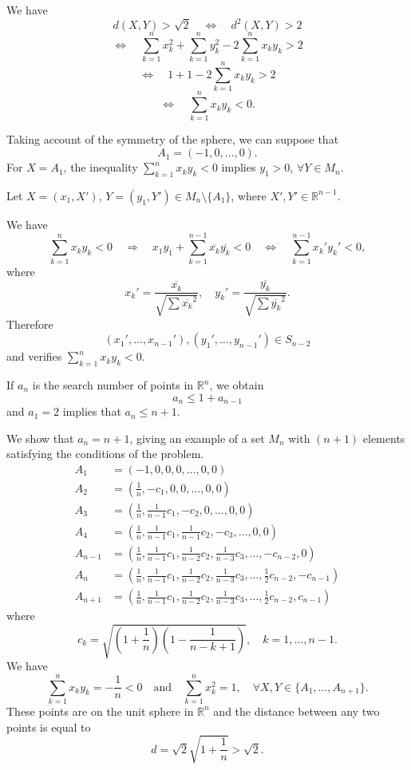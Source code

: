 \documentclass{article}
\begin{document}
We have
\[
d(X,Y) > \sqrt{2} \quad \Leftrightarrow \quad d^2(X,Y) > 2
\]
\[
\Leftrightarrow \quad \sum_{k=1}^n x_k^2 + \sum_{k=1}^n y_k^2 - 2\sum_{k=1}^n x_k y_k > 2
\]
\[
\Leftrightarrow \quad 1 + 1 - 2\sum_{k=1}^n x_k y_k > 2
\]
\[
\Leftrightarrow \quad \sum_{k=1}^n x_k y_k < 0.
\]

Taking account of the symmetry of the sphere, we can suppose that
\[
A_1 = (-1, 0, \ldots, 0).
\]
For $X = A_1$, the inequality $\sum_{k=1}^n x_k y_k < 0$ implies $y_1 > 0$, $\forall Y \in M_n$.

Let $X = (x_1, X')$, $Y = (y_1, Y') \in M_n \setminus \{A_1\}$, where $X', Y' \in \mathbb{R}^{n-1}$.

We have
\[
\sum_{k=1}^n x_k y_k < 0 \quad \Rightarrow \quad x_1 y_1 + \sum_{k=1}^{n-1} \overline{x_k} \overline{y_k} < 0 \quad \Leftrightarrow \quad \sum_{k=1}^{n-1} x_k' y_k' < 0,
\]
where
\[
x_k' = \frac{\overline{x_k}}{\sqrt{\sum \overline{x_k}^2}}, \quad y_k' = \frac{\overline{y_k}}{\sqrt{\sum \overline{y_k}^2}}.
\]
Therefore
\[
(x_1', \ldots, x_{n-1}'), (y_1', \ldots, y_{n-1}') \in S_{n-2}
\]
and verifies $\sum_{k=1}^n x_k y_k < 0$.

If $a_n$ is the search number of points in $\mathbb{R}^n$, we obtain
\[
a_n \leq 1 + a_{n-1}
\]
and $a_1 = 2$ implies that $a_n \leq n+1$.

We show that $a_n = n+1$, giving an example of a set $M_n$ with $(n+1)$ elements satisfying the conditions of the problem.
\[
\begin{aligned}
A_1 &= (-1,0,0,0,\ldots,0,0) \\
A_2 &= \left(\frac{1}{n}, -c_1, 0,0,\ldots,0,0\right) \\
A_3 &= \left(\frac{1}{n}, \frac{1}{n-1}c_1, -c_2,0,\ldots,0,0\right) \\
A_4 &= \left(\frac{1}{n}, \frac{1}{n-1}c_1, \frac{1}{n-1}c_2, -c_3, \ldots,0,0\right) \\
A_{n-1} &= \left(\frac{1}{n}, \frac{1}{n-1}c_1, \frac{1}{n-2}c_2, \frac{1}{n-3}c_3, \ldots, -c_{n-2},0\right) \\
A_n &= \left(\frac{1}{n}, \frac{1}{n-1}c_1, \frac{1}{n-2}c_2, \frac{1}{n-3}c_3, \ldots, \frac{1}{2}c_{n-2}, -c_{n-1}\right) \\
A_{n+1} &= \left(\frac{1}{n}, \frac{1}{n-1}c_1, \frac{1}{n-2}c_2, \frac{1}{n-3}c_3, \ldots, \frac{1}{2}c_{n-2}, c_{n-1}\right)
\end{aligned}
\]
where
\[
c_k = \sqrt{\left(1+\frac{1}{n}\right)\left(1 - \frac{1}{n - k + 1}\right)}, \quad k=1,\ldots,n-1.
\]
We have
\[
\sum_{k=1}^n x_k y_k = -\frac{1}{n} < 0
\quad \text{and} \quad
\sum_{k=1}^n x_k^2 = 1, \quad \forall X,Y \in \{A_1,\ldots,A_{n+1}\}.
\]
These points are on the unit sphere in $\mathbb{R}^n$ and the distance between any two points is equal to
\[
d = \sqrt{2}\sqrt{1+\frac{1}{n}} > \sqrt{2}.
\]
\end{document}
